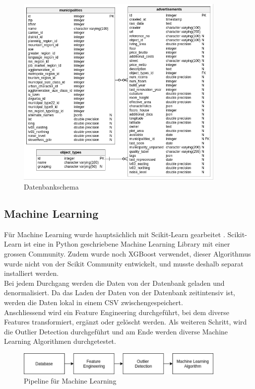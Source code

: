 \begin{figure}[h]
\centering
\includegraphics[width=0.9\textwidth]{images/erm.png}
\caption[Datenbankschema]{Datenbankschema}%
\label{fig:db}
\end{figure}

\subsection{Machine Learning}
Für Machine Learning wurde hauptsächlich mit Scikit-Learn gearbeitet \cite{scikit}. Scikit-Learn ist eine in Python geschriebene Machine Learning Library mit einer grossen Community. Zudem wurde noch XGBoost verwendet, dieser Algorithmus wurde nicht von der Scikit Community entwickelt, und musste deshalb separat installiert werden. \\[2ex]
%
Bei jedem Durchgang werden die Daten von der Datenbank geladen und denormalisiert. Da das Laden der Daten von der Datenbank zeitintensiv ist, werden die Daten lokal in einem CSV zwischengespeichert.\\
Anschliessend wird ein Feature Engineering durchgeführt, bei dem diverse Features transformiert, ergänzt oder gelöscht werden. Als weiteren Schritt, wird die Outlier Detection durchgeführt und am Ende werden diverse Machine Learning Algorithmen durchgetestet.

\begin{figure}[h]
\centering
\includegraphics[width=0.9\textwidth]{images/machine_learning_pipeline.png}
\caption[Pipeline für Machine Learning]{Pipeline für Machine Learning}%
\label{fig:ml_pipeline}
\end{figure}

